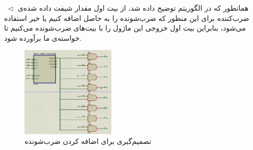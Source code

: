 \documentclass[12pt,onecolumn,a4paper,fleqn]{article}
\begin{document}
	\noindent
	$\;\triangleleft$
	همانطور که در الگوریتم  توضیح داده شد، از بیت اول مقدار شیفت داده شده‌ی ضرب‌کننده برای این منظور که ضرب‌شونده را به حاصل اضافه کنیم یا خیر استفاده می‌شود، بنابراین بیت اول خروجی این ماژول را با بیت‌های ضرب‌شونده  می‌کنیم تا خواسته‌ی ما برآورده شود.
	\begin{figure}[H]
		\centering
		\includegraphics[width=0.4\textwidth]{source/decidetoadd.png}
		\caption{تصمیم‌گیری برای اضافه کردن ضرب‌شونده}
		\label{fig:decidetoadd}
	\end{figure}
\end{document}
